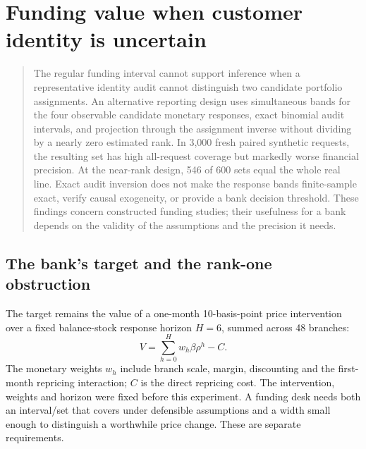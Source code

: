 \chapter{Funding value when customer identity is uncertain}
\label{integrated:weak_audit_projection}


\begin{quote}\small
The regular funding interval cannot support inference when a representative identity
audit cannot distinguish two candidate portfolio assignments. An alternative reporting design uses simultaneous bands for the four observable
candidate monetary responses, exact binomial audit intervals, and projection
through the assignment inverse without dividing by a nearly zero estimated
rank. In 3,000 fresh paired synthetic requests, the resulting set has high
all-request coverage but markedly worse financial precision. At the near-rank
design, 546 of 600 sets equal the whole real line. Exact audit inversion does
not make the response bands finite-sample exact, verify causal exogeneity, or
provide a bank decision threshold. These findings concern constructed funding studies; their usefulness for a
bank depends on the validity of the assumptions and the precision it needs.
\end{quote}

\section{The bank's target and the rank-one obstruction}

The target remains the value of a one-month 10-basis-point price intervention
over a fixed balance-stock response horizon $H=6$, summed across 48 branches:
\begin{equation}\label{integrated:weak_audit_projection:eq:target}
 V=\sum_{h=0}^{H}w_h\beta\rho^h-C.
\end{equation}
The monetary weights $w_h$ include branch scale, margin, discounting and the
first-month repricing interaction; $C$ is the direct repricing cost. The
intervention, weights and horizon were fixed before this experiment. A funding
desk needs both an interval/set that covers under defensible assumptions and
a width small enough to distinguish a worthwhile price change. These are
separate requirements.

